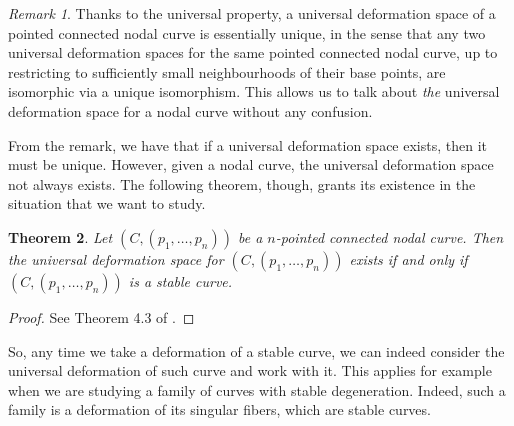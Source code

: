 \documentclass[a4paper,12 pt,titlepage,twoside]{book}
\theoremstyle{plain}
\newtheorem{thm}{Theorem}[section]
\theoremstyle{theorem}
\theoremstyle{definition}
\theoremstyle{remark}
\newtheorem{oss}[thm]{Remark}
\begin{document}
\begin{oss}
	Thanks to the universal property, a universal deformation space of a pointed connected nodal curve is essentially unique, in the sense that any two universal deformation spaces for the same pointed connected nodal curve, up to restricting to sufficiently small neighbourhoods of their base points, are isomorphic via a unique isomorphism. This allows us to talk about \emph{the} universal deformation space for a nodal curve without any confusion.
\end{oss}
From the remark, we have that if a universal deformation space exists, then it must be unique. However, given a nodal curve, the universal deformation space not always exists. The following theorem, though, grants its existence in the situation that we want to study.
\begin{thm}\label{thm: kuranishi exists}
	Let $(C,(p_1,\dots,p_n))$ be a $n$-pointed connected nodal curve. Then the universal deformation space for $(C,(p_1,\dots,p_n))$ exists if and only if $(C,(p_1,\dots,p_n))$ is a stable curve.
\end{thm}
\begin{proof}
	See Theorem 4.3 of \cite{MR2807457}.
\end{proof}
So, any time we take a deformation of a stable curve, we can indeed consider the universal deformation of such curve and work with it.
This applies for example when we are studying a family of curves with stable degeneration. Indeed, such a family is a deformation of its singular fibers, which are stable curves. 
\end{document}
